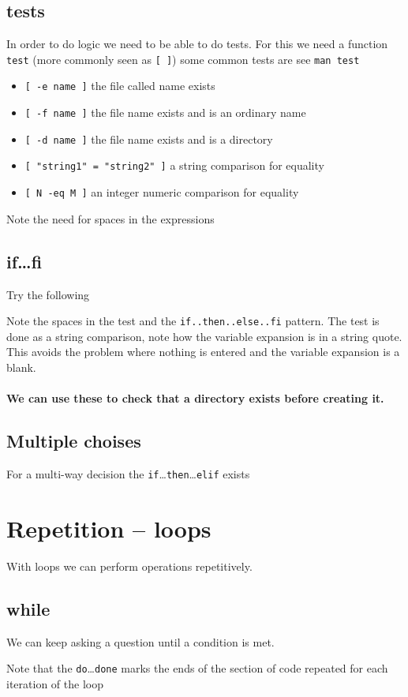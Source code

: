 \documentclass[12pt,a4paper]{article}
\begin{document}
\subsection{tests}
In order to do logic we need to be able to do tests.  For this we need
a function \texttt{test} (more commonly seen as \texttt{[ ]}) some
common tests are see \texttt{man test}
\begin{itemize}
\item \verb*:[ -e name ]: the file called name exists
\item \verb*:[ -f name ]: the file name exists and is an ordinary name
\item \verb*:[ -d name ]: the file name exists and is a directory
\item \verb*:[ "string1" = "string2" ]: a string comparison for equality
\item \verb*:[ N -eq M ]: an integer numeric comparison for equality
\end{itemize}
Note the need for spaces in the expressions

\subsection{if\ldots fi}
Try the following

Note the spaces in the test and the \texttt{if..then..else..fi}
pattern.  The test is done as a string comparison, note how the
variable expansion is in a string quote.  This avoids the problem
where nothing is entered and the variable expansion is a blank.

\paragraph{We can use these to check that a directory exists before creating it.}


\subsection{Multiple choises}
For a multi-way decision the
\texttt{if}\ldots\texttt{then}\ldots\texttt{elif} exists



\section{Repetition -- loops}
With loops we can perform operations repetitively.

\subsection{while}
We can keep asking a question until a condition is met.

Note that the \texttt{do}\ldots\texttt{done} marks the ends of the
section of code repeated for each iteration of the loop
\end{document}
